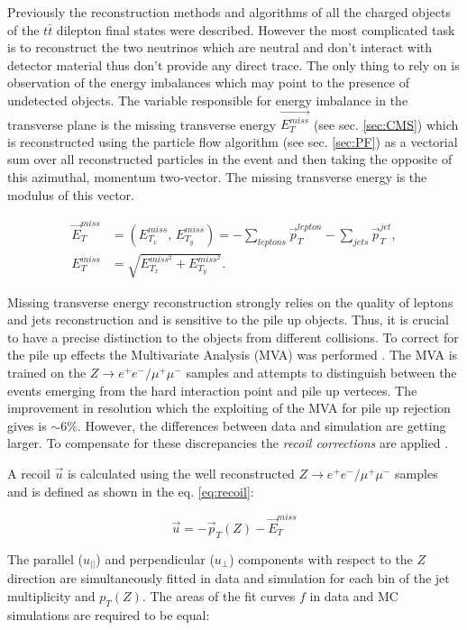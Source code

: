 Previously the reconstruction methods and algorithms of all the charged objects of the $t\bar{t}$ dilepton final states were described. However the most complicated 
task is to reconstruct the two neutrinos which are neutral and don't interact with detector material thus don't provide any direct trace. The only thing to rely on is
observation of the energy imbalances which may point to the presence of undetected objects. The variable responsible for energy imbalance in the transverse plane is 
the missing transverse energy $\vec{E^{miss}_{T}}$ (see sec. \ref{sec:CMS}) which is reconstructed using the particle flow algorithm \cite{CMS-PAS-PFT-09-001} (see sec. \ref{sec:PF})
as a vectorial sum over all reconstructed particles in the event and then taking the opposite of this azimuthal, momentum two-vector. The missing transverse energy is the modulus
of this vector.

\begin{align}
 \vec{E}_{T}^{miss} & = (E_{T_{x}}^{miss}, \, E_{T_{y}}^{miss}) = - \sum_{leptons} \vec{p}_{T}^{lepton} - \sum_{jets} \vec{p}_{T}^{jet}, \\
 E_{T}^{miss} & = \sqrt{E_{T_{x}}^{miss^{2}} + E_{T_{y}}^{miss^{2}}}.
\end{align}

Missing transverse energy reconstruction strongly relies on the quality of leptons and jets reconstruction and is sensitive to the pile up objects. Thus, it is
crucial to have a precise distinction to the objects from different collisions. To correct for the pile up effects the Multivariate Analysis (MVA) was performed \cite{CMS-PAS-JME-12-002}.
The MVA is trained on the $Z \to e^{+}e^{-} / \mu^{+}\mu^{-}$ samples and attempts to distinguish between the events emerging from the hard interaction point and
pile up verteces. The improvement in resolution which the exploiting of the MVA for pile up rejection gives is $\sim 6\%$. However, the differences between data
and simulation are getting larger. To compensate for these discrepancies the \textit{recoil corrections} are applied \cite{CMS-PAS-JME-12-002}. 

A recoil $\vec{u}$ is calculated using the well reconstructed $Z \to e^{+}e^{-} / \mu^{+}\mu^{-}$ samples and is defined as shown in the eq. \ref{eq:recoil}:

\begin{equation}
 \vec{u} = - \vec{p}_{T}(Z) - \vec{E}_{T}^{miss}
\end{equation}

The parallel ($u_{||}$) and perpendicular ($u_{\perp}$) components with respect to the $Z$ direction are simultaneously fitted in data and simulation for each bin
of the jet multiplicity and $p_{T}(Z)$. The areas of the fit curves $f$ in data and MC simulations are required to be equal:

